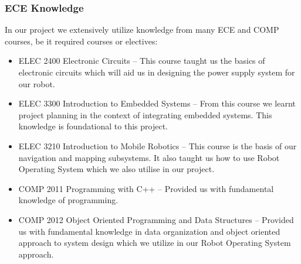 \documentclass{article}
\begin{document}
\subsubsection{ECE Knowledge}
In our project we extensively utilize knowledge from many ECE and COMP courses, be it required courses or electives:
\begin{itemize}
    \item ELEC 2400 Electronic Circuits -- This course taught us the basics of electronic circuits which will aid us in designing the power supply system for our robot.
    \item ELEC 3300 Introduction to Embedded Systems -- From this course we learnt project planning in the context of integrating embedded systems. This knowledge is foundational to this project.
    \item ELEC 3210 Introduction to Mobile Robotics -- This course is the basis of our navigation and mapping subsystems. It also taught us how to use Robot Operating System which we also utilise in our project.
    \item COMP 2011 Programming with C++ -- Provided us with fundamental knowledge of programming.
    \item COMP 2012 Object Oriented Programming and Data Structures -- Provided us with fundamental knowledge in data organization and object oriented approach to system design which we utilize in our Robot Operating System approach.
\end{itemize}
\end{document}

